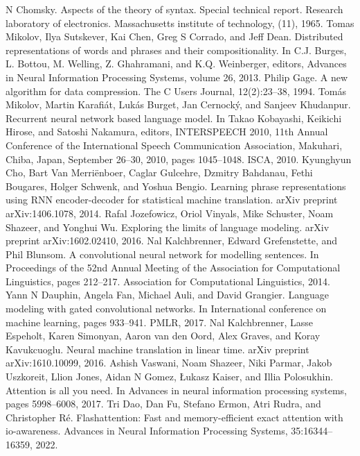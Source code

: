 \begin{chapterreferences}
 N Chomsky. Aspects of the theory of syntax. Special technical report. Research laboratory of electronics. Massachusetts institute of technology, (11), 1965.
 Tomas Mikolov, Ilya Sutskever, Kai Chen, Greg S Corrado, and Jeff Dean. Distributed representations of words and phrases and their compositionality. In C.J. Burges, L. Bottou, M. Welling, Z. Ghahramani, and K.Q. Weinberger, editors, Advances in Neural Information Processing Systems, volume 26, 2013.
 Philip Gage. A new algorithm for data compression. The C Users Journal, 12(2):23–38, 1994.
 Tomás Mikolov, Martin Karafiát, Lukás Burget, Jan Cernocký, and Sanjeev Khudanpur. Recurrent neural network based language model. In Takao Kobayashi, Keikichi Hirose, and Satoshi Nakamura, editors, INTERSPEECH 2010, 11th Annual Conference of the International Speech Communication Association, Makuhari, Chiba, Japan, September 26–30, 2010, pages 1045–1048. ISCA, 2010.
 Kyunghyun Cho, Bart Van Merriënboer, Caglar Gulcehre, Dzmitry Bahdanau, Fethi Bougares, Holger Schwenk, and Yoshua Bengio. Learning phrase representations using RNN encoder-decoder for statistical machine translation. arXiv preprint arXiv:1406.1078, 2014.
 Rafal Jozefowicz, Oriol Vinyals, Mike Schuster, Noam Shazeer, and Yonghui Wu. Exploring the limits of language modeling. arXiv preprint arXiv:1602.02410, 2016.
 Nal Kalchbrenner, Edward Grefenstette, and Phil Blunsom. A convolutional neural network for modelling sentences. In Proceedings of the 52nd Annual Meeting of the Association for Computational Linguistics, pages 212–217. Association for Computational Linguistics, 2014.
 Yann N Dauphin, Angela Fan, Michael Auli, and David Grangier. Language modeling with gated convolutional networks. In International conference on machine learning, pages 933–941. PMLR, 2017.
 Nal Kalchbrenner, Lasse Espeholt, Karen Simonyan, Aaron van den Oord, Alex Graves, and Koray Kavukcuoglu. Neural machine translation in linear time. arXiv preprint arXiv:1610.10099, 2016.
 Ashish Vaswani, Noam Shazeer, Niki Parmar, Jakob Uszkoreit, Llion Jones, Aidan N Gomez, Łukasz Kaiser, and Illia Polosukhin. Attention is all you need. In Advances in neural information processing systems, pages 5998–6008, 2017.
 Tri Dao, Dan Fu, Stefano Ermon, Atri Rudra, and Christopher Ré. Flashattention: Fast and memory-efficient exact attention with io-awareness. Advances in Neural Information Processing Systems, 35:16344–16359, 2022.

\end{chapterreferences}
